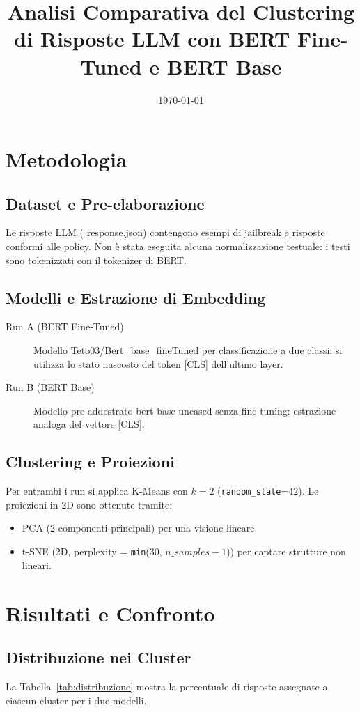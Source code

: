 \documentclass[a4paper,12pt]{article}
\title{Analisi Comparativa del Clustering di Risposte LLM con BERT Fine-Tuned e BERT Base}
\date{\today}
\begin{document}
\maketitle
\section{Metodologia}
\subsection{Dataset e Pre-elaborazione}
Le risposte LLM (	{response.json}) contengono esempi di jailbreak e risposte conformi alle policy. Non è stata eseguita alcuna normalizzazione testuale: i testi sono tokenizzati con il tokenizer di BERT.

\subsection{Modelli e Estrazione di Embedding}
\begin{description}
  \item[Run A (BERT Fine-Tuned)] Modello Teto03/Bert_base_fineTuned per classificazione a due classi: si utilizza lo stato nascosto del token [CLS] dell'ultimo layer.
  \item[Run B (BERT Base)] Modello pre-addestrato bert-base-uncased senza fine-tuning: estrazione analoga del vettore [CLS].
\end{description}

\subsection{Clustering e Proiezioni}
Per entrambi i run si applica K-Means con $k=2$ (\texttt{random_state}=42). Le proiezioni in 2D sono ottenute tramite:
\begin{itemize}
  \item PCA (2 componenti principali) per una visione lineare.
  \item t-SNE (2D, perplexity = \texttt{min}(30, $n\_samples-1$)) per captare strutture non lineari.
\end{itemize}

\section{Risultati e Confronto}

\subsection{Distribuzione nei Cluster}
La Tabella~\ref{tab:distribuzione} mostra la percentuale di risposte assegnate a ciascun cluster per i due modelli.
\end{document}
